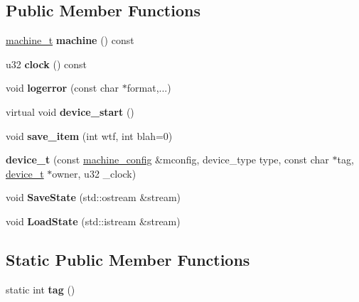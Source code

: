 \subsection*{Public Member Functions}
\begin{DoxyCompactItemize}
\item 
\hypertarget{classdevice__t_afe11f3dfed3f5952db60affa12ebece4}{\hyperlink{structdevice__t_1_1machine__t}{machine\-\_\-t} {\bfseries machine} () const }\label{classdevice__t_afe11f3dfed3f5952db60affa12ebece4}

\item 
\hypertarget{classdevice__t_a308991cb836a5d7733deb280d3c91d18}{u32 {\bfseries clock} () const }\label{classdevice__t_a308991cb836a5d7733deb280d3c91d18}

\item 
\hypertarget{classdevice__t_a13fbc9b8b779e8592e871c589ca1a6ad}{void {\bfseries logerror} (const char $\ast$format,...)}\label{classdevice__t_a13fbc9b8b779e8592e871c589ca1a6ad}

\item 
\hypertarget{classdevice__t_a230069bb9d64cc3dc2353e5069be1294}{virtual void {\bfseries device\-\_\-start} ()}\label{classdevice__t_a230069bb9d64cc3dc2353e5069be1294}

\item 
\hypertarget{classdevice__t_a6d4346c89ce538c096e6ae71308336ea}{void {\bfseries save\-\_\-item} (int wtf, int blah=0)}\label{classdevice__t_a6d4346c89ce538c096e6ae71308336ea}

\item 
\hypertarget{classdevice__t_a764a57dca49319a408af8c9f7f86017b}{{\bfseries device\-\_\-t} (const \hyperlink{structmachine__config}{machine\-\_\-config} \&mconfig, device\-\_\-type type, const char $\ast$tag, \hyperlink{classdevice__t}{device\-\_\-t} $\ast$owner, u32 \-\_\-clock)}\label{classdevice__t_a764a57dca49319a408af8c9f7f86017b}

\item 
\hypertarget{classdevice__t_a45488a0945d54e5f2b270bdd0ccb22bb}{void {\bfseries Save\-State} (std\-::ostream \&stream)}\label{classdevice__t_a45488a0945d54e5f2b270bdd0ccb22bb}

\item 
\hypertarget{classdevice__t_a4083c4a3e98b3f7638ceee896e8637fd}{void {\bfseries Load\-State} (std\-::istream \&stream)}\label{classdevice__t_a4083c4a3e98b3f7638ceee896e8637fd}

\end{DoxyCompactItemize}
\subsection*{Static Public Member Functions}
\begin{DoxyCompactItemize}
\item 
\hypertarget{classdevice__t_a77b587f03710c5d01fc1d572ed7ebd02}{static int {\bfseries tag} ()}\label{classdevice__t_a77b587f03710c5d01fc1d572ed7ebd02}

\end{DoxyCompactItemize}


